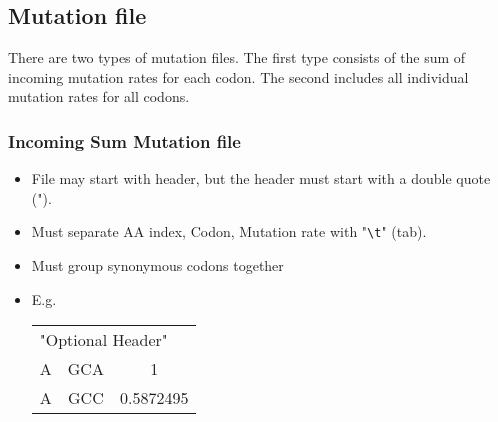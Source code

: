 \documentclass{article}
\begin{document}
	\subsection{Mutation file}
		\label{subsec:this}
		There are two types of mutation files. The first type consists of the sum of incoming mutation rates for each codon.
		The second includes all individual mutation rates for all codons. 
		\subsubsection{Incoming Sum Mutation file}
			\begin{itemize}
				\item File may start with header, but the header must start with a double quote (").
				\item Must separate AA index, Codon, Mutation rate with "\verb+\t+" (tab).
				\item Must group synonymous codons together
				\item E.g. \\
					\begin{tabular}{c c c}
					\multicolumn{3}{l}{"Optional Header"} \\
					A & GCA & 1 \\
					A & GCC & 0.5872495 \\
					\end{tabular}
			\end{itemize}
\end{document}
